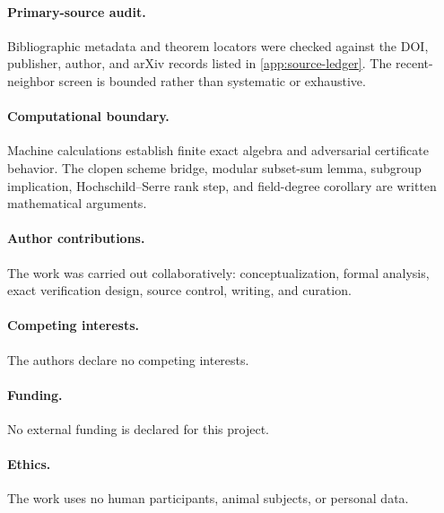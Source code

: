\paragraph{Primary-source audit.}
Bibliographic metadata and theorem locators were checked against the DOI,
publisher, author, and arXiv records listed in
\cref{app:source-ledger}.  The recent-neighbor screen is bounded rather than
systematic or exhaustive.

\paragraph{Computational boundary.}
Machine calculations establish finite exact algebra and adversarial
certificate behavior.  The clopen scheme bridge, modular subset-sum lemma,
subgroup implication, Hochschild--Serre rank step, and field-degree
corollary are written mathematical arguments.

\paragraph{Author contributions.}
The work was carried out collaboratively: conceptualization, formal
analysis, exact verification design, source control, writing, and curation.

\paragraph{Competing interests.}
The authors declare no competing interests.

\paragraph{Funding.}
No external funding is declared for this project.

\paragraph{Ethics.}
The work uses no human participants, animal subjects, or personal data.

